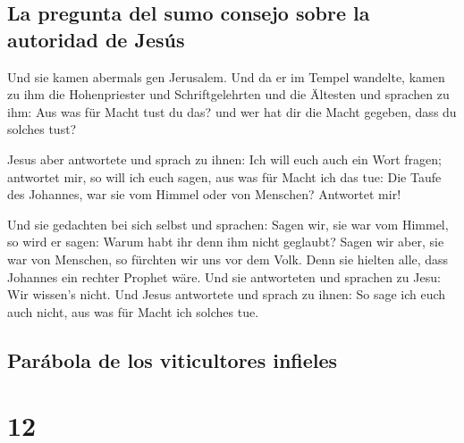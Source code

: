 \hypertarget{la-pregunta-del-sumo-consejo-sobre-la-autoridad-de-jesuxfas}{%
\subsection{La pregunta del sumo consejo sobre la autoridad de
Jesús}\label{la-pregunta-del-sumo-consejo-sobre-la-autoridad-de-jesuxfas}}

 Und sie kamen abermals gen Jerusalem. Und da er im
Tempel wandelte, kamen zu ihm die Hohenpriester und Schriftgelehrten und
die Ältesten  und sprachen zu ihm: Aus was für Macht tust
du das? und wer hat dir die Macht gegeben, dass du solches tust?

 Jesus aber antwortete und sprach zu ihnen: Ich will euch
auch ein Wort fragen; antwortet mir, so will ich euch sagen, aus was für
Macht ich das tue:  Die Taufe des Johannes, war sie vom
Himmel oder von Menschen? Antwortet mir!

 Und sie gedachten bei sich selbst und sprachen: Sagen
wir, sie war vom Himmel, so wird er sagen: Warum habt ihr denn ihm nicht
geglaubt?  Sagen wir aber, sie war von Menschen, so
fürchten wir uns vor dem Volk. Denn sie hielten alle, dass Johannes ein
rechter Prophet wäre.  Und sie antworteten und sprachen
zu Jesu: Wir wissen's nicht. Und Jesus antwortete und sprach zu ihnen:
So sage ich euch auch nicht, aus was für Macht ich solches tue.

\hypertarget{paruxe1bola-de-los-viticultores-infieles}{%
\subsection{Parábola de los viticultores
infieles}\label{paruxe1bola-de-los-viticultores-infieles}}

\hypertarget{section-11}{%
\section{12}\label{section-11}}

